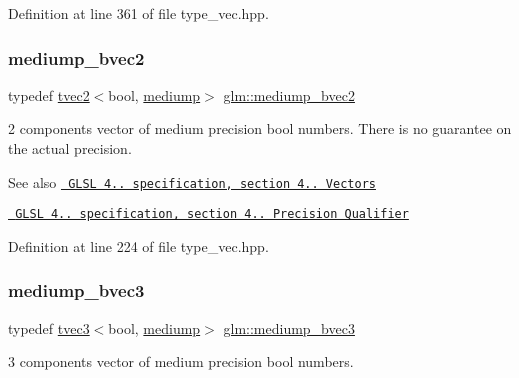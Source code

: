 Definition at line 361 of file type\+\_\+vec.\+hpp.

\mbox{\label{group__core__precision_gaf46a55555e71730f77b5c885d20ae8e2}} 
\subsubsection{\texorpdfstring{mediump\_bvec2}{mediump\_bvec2}}
{\footnotesize\ttfamily typedef \mbox{\hyperlink{structglm_1_1tvec2}{tvec2}}$<$bool, \mbox{\hyperlink{namespaceglm_a0f04f086094c747d227af4425893f545a6416f3ea0c9025fb21ed50c4d6620482}{mediump}}$>$ \mbox{\hyperlink{group__core__precision_gaf46a55555e71730f77b5c885d20ae8e2}{glm\+::mediump\+\_\+bvec2}}}

2 components vector of medium precision bool numbers. There is no guarantee on the actual precision.

\begin{DoxySeeAlso}{See also}
\href{http://www.opengl.org/registry/doc/GLSLangSpec.4.20.8.pdf}{\texttt{ G\+L\+SL 4.. specification, section 4.. Vectors}} 

\href{http://www.opengl.org/registry/doc/GLSLangSpec.4.20.8.pdf}{\texttt{ G\+L\+SL 4.. specification, section 4.. Precision Qualifier}} 
\end{DoxySeeAlso}


Definition at line 224 of file type\+\_\+vec.\+hpp.

\mbox{\label{group__core__precision_ga39d35dfb49fff9cf4a6458d8027d2a8b}} 
\subsubsection{\texorpdfstring{mediump\_bvec3}{mediump\_bvec3}}
{\footnotesize\ttfamily typedef \mbox{\hyperlink{structglm_1_1tvec3}{tvec3}}$<$bool, \mbox{\hyperlink{namespaceglm_a0f04f086094c747d227af4425893f545a6416f3ea0c9025fb21ed50c4d6620482}{mediump}}$>$ \mbox{\hyperlink{group__core__precision_ga39d35dfb49fff9cf4a6458d8027d2a8b}{glm\+::mediump\+\_\+bvec3}}}

3 components vector of medium precision bool numbers.

